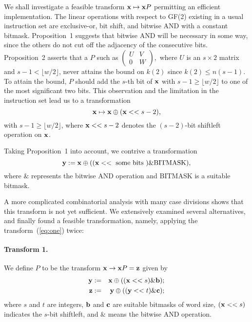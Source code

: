 We shall investigate a feasible transform ${\bf x} \mapsto {\bf x} P$
permitting an efficient implementation.
The linear operations with respect to GF(2)
existing in a usual instruction set
are exclusive-or, bit shift, and bitwise AND with a constant
bitmask.
Proposition~1 suggests that bitwise AND will be necessary in some way,
since the others do not cut off the adjacency
of the consecutive bits.
Proposition~2 asserts that a $P$ such as
$
 \left(
 \begin{array}{cc}
  U & V \\ 
  0 & W
 \end{array}
 \right),
$
where $U$ is an $s\times 2$ matrix and $s -1 < \lfloor w/2 \rfloor$,
never attains the bound on $k(2)$ since $k(2)\leq n(s-1)$.
To attain the bound, $P$ should add the $s$-th bit of ${\bf x}$ with
$s-1 \geq \lfloor w/2 \rfloor$ to one of the most significant two bits.
This observation and the limitation in the instruction set lead us
to a transformation
\begin{equation}
 {\bf x} \mapsto {\bf x} \oplus ({\bf x} << s-2),
 \label{eq:simple}
\end{equation}
with $s-1\geq \lfloor w/2 \rfloor$,
where ${\bf x} << s-2$ denotes the $(s-2)$-bit shiftleft operation
on ${\bf x}$.

Taking Proposition~1 into account, we contrive a transformation
\begin{equation}
 {\bf y} := {\bf x} \oplus (({\bf x} << \mbox{ some bits } ) \& \mbox{BITMASK}),
 \label{eq:one}
\end{equation}
where $\&$ represents the bitwise AND operation and BITMASK is a suitable
bitmask.

A more complicated combinatorial analysis with
many case divisions shows that this transform is not yet sufficient.
We extensively examined several alternatives, and finally found
a feasible transformation,
namely, applying the transform~(\ref{eq:one})
twice:

\paragraph{Transform 1.}
We define $P$ to be the transform ${\bf x} \rightarrow {\bf x} P = {\bf z}$ given by
\begin{eqnarray}
  {\bf y} & := & {\bf x} \oplus (({\bf x} << s) \& {\bf b});  \nonumber \\
  {\bf z} & := & {\bf y} \oplus (({\bf y} << t) \& {\bf c});
  \label{eq:trans}
\end{eqnarray}
where $s$ and $t$ are integers,
${\bf b}$ and ${\bf c}$ are suitable bitmasks of word size,
$({\bf x} << s)$ indicates the $s$-bit shiftleft,
and $\&$ means the bitwise AND operation.
\vskip 3mm

